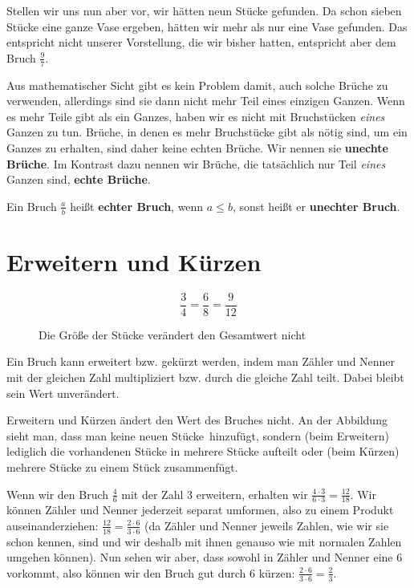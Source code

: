 \documentclass[../../main]{subfiles}
\begin{document}
Stellen wir uns nun aber vor, wir hätten neun Stücke gefunden. Da schon sieben Stücke eine ganze Vase ergeben, hätten wir mehr als nur eine Vase gefunden. Das entspricht nicht unserer Vorstellung, die wir bisher hatten, entspricht aber dem Bruch $\frac{9}{7}$.

Aus mathematischer Sicht gibt es kein Problem damit, auch solche Brüche zu verwenden, allerdings sind sie dann nicht mehr Teil eines einzigen Ganzen. Wenn es mehr Teile gibt als ein Ganzes, haben wir es nicht mit Bruchstücken \textit{eines} Ganzen zu tun. Brüche, in denen es mehr Bruchstücke gibt als nötig sind, um ein Ganzes zu erhalten, sind daher keine echten Brüche. Wir nennen sie \textbf{unechte Brüche}. Im Kontrast dazu nennen wir Brüche, die tatsächlich nur Teil \textit{eines} Ganzen sind, \textbf{echte Brüche}.

\begin{definition}{}
Ein Bruch $\frac{a}{b}$ heißt \textbf{echter Bruch}, wenn $a\leq b$, sonst heißt er \textbf{unechter Bruch}.
\end{definition}



\section{Erweitern und Kürzen}
\begin{figure}[htb]
    \centering
    
    \[\frac{3}{4}=\frac{6}{8}=\frac{9}{12}\]
    \caption{Die Größe der Stücke verändert den Gesamtwert nicht}
    \label{fig:piece_size}
\end{figure}
\begin{theorem}{}
Ein Bruch kann erweitert bzw. gekürzt werden, indem man Zähler und Nenner mit der gleichen Zahl multipliziert bzw. durch die gleiche Zahl teilt. Dabei bleibt sein Wert unverändert.
\end{theorem}
Erweitern und Kürzen ändert den Wert des Bruches nicht. An der Abbildung sieht man, dass man keine neuen \glqq Stücke\grqq~hinzufügt, sondern (beim Erweitern) lediglich die vorhandenen Stücke in mehrere Stücke aufteilt oder (beim Kürzen) mehrere Stücke zu einem Stück zusammenfügt.

\begin{example}{}
Wenn wir den Bruch $\frac{4}{6}$ mit der Zahl 3 erweitern, erhalten wir $\frac{4\cdot 3}{6\cdot 3}=\frac{12}{18}$. Wir können Zähler und Nenner jederzeit separat umformen, also zu einem Produkt auseinanderziehen: $\frac{12}{18}=\frac{2\cdot 6}{3\cdot 6}$ (da Zähler und Nenner jeweils Zahlen, wie wir sie schon kennen, sind und wir deshalb mit ihnen genauso wie mit normalen Zahlen umgehen können). Nun sehen wir aber, dass sowohl in Zähler und Nenner eine 6 vorkommt, also können wir den Bruch gut durch 6 kürzen: $\frac{2\cdot 6}{3\cdot 6}=\frac{2}{3}$.
\end{example}
\end{document}
